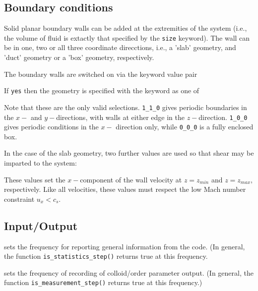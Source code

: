 \subsection{Boundary conditions}

Solid planar boundary walls can be added at the extremities of the
system (i.e., the volume of fluid is extactly that specified by
the \texttt{size} keyword). The wall can be in one, two or all three
coordinate direcctions, i.e., a 'slab' geometry, and 'duct' geometry
or a 'box' geometry, respectively.

The boundary walls are switched on via the keyword value pair


If \texttt{yes} then the geometry is specified with the keyword
as one of


Note that these are the only valid selections. \texttt{1\_1\_0}
gives periodic boundaries in the $x-$ and $y-$directions, with
walls at either edge in the $z-$direction. \texttt{1\_0\_0}
gives periodic conditions in the $x-$ direction only, while
\texttt{0\_0\_0} is a fully enclosed box.

In the case of the slab geometry, two further values are used so
that shear may be imparted to the system:



These values set the $x-$component of the wall velocity at
$z = z_{min}$ and $z = z_{max}$, respectively. Like all
velocities, these values must respect the low Mach number
constraint $u_x < c_s$.
\subsection{Input/Output}


sets the frequency for reporting general information from
the code. (In general, the function
 \texttt{is\_statistics\_step()} returns true at this frequency.


sets the frequency of recording of colloid/order parameter output.
(In general, the function \texttt{is\_measurement\_step()} returns
true at this frequency.)


